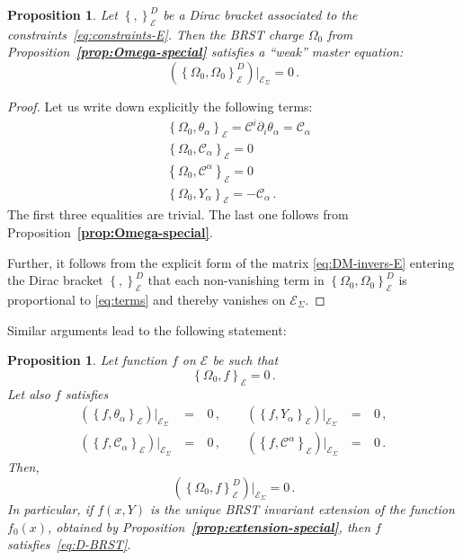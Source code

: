 \documentclass[a4paper,11pt]{amsart}
\newtheorem{prop}[thm]{Proposition}
\numberwithin{thm}{section} %
\numberwithin{equation}{section} %
\numberwithin{figure}{section} %
\newcommand{\bref}[1]{{\bf \ref{#1}}}
\newcommand{\pb}[2]{\left\{{}#1{},{}#2{}\right\}}
\renewcommand{\:}{{\rm\, :\,}}
\def\d{\partial}
\def\cc{{\mathcal C}}
\def\E{{ \mathcal E}}
\begin{document}
\begin{prop}\label{prop:Omega-red}
Let $\pb{}{}^D_\E$ be a Dirac bracket associated to
the constraints~\eqref{eq:constraints-E}. Then the BRST charge $\Omega_0$
from Proposition~\bref{prop:Omega-special} satisfies a ``weak'' master
equation:
\begin{equation}
\left(  \pb{\Omega_0}{\Omega_0}^D_\E \right){\bigr|}_{\E_\Sigma}=0\,.
\end{equation}
\end{prop}
\begin{proof}
Let us write down explicitly the following terms:
\begin{equation}
\label{eq:terms}
  \begin{split}
&    \pb{\Omega_0}{\theta_\alpha}_\E=\cc^i\d_i\theta_\alpha=\cc_\alpha\\
&    \pb{\Omega_0}{\cc_\alpha}_\E=0\\
&    \pb{\Omega_0}{\cc^\alpha}_\E=0\\
&    \pb{\Omega_0}{Y_\alpha}_\E=-\cc_\alpha\,.
\end{split}
\end{equation}
The first three equalities are trivial. The last one follows from
Proposition~\bref{prop:Omega-special}.


Further, it follows from the explicit form of the matrix
\eqref{eq:DM-invers-E} entering the Dirac bracket
$\pb{}{}^D_\E$ that each non-vanishing term in $\pb{\Omega_0}{\Omega_0}^D_\E$ is
proportional to \eqref{eq:terms} and thereby vanishes on $\E_\Sigma$.
\end{proof}
Similar arguments lead to the following statement:
\begin{prop}\label{prop:observables-red}
Let function $f$ on $\E$ be such that
\begin{equation}
  \pb{\Omega_0}{f}_\E=0\,.
\end{equation}
Let also $f$ satisfies
\begin{equation}
\begin{aligned}
  (\pb{f}{\theta_\alpha}_\E){\bigr|}_{\E_\Sigma}&~=~&0\,,\qquad
  (\pb{f}{Y_\alpha}_\E){\bigr|}_{\E_\Sigma}&~=~&0\,,\\
  (\pb{f}{\cc_\alpha}_\E){\bigr|}_{\E_\Sigma}&~=~&0\,,\qquad
  (\pb{f}{\cc^\alpha}_\E){\bigr|}_{\E_\Sigma}&~=~&0\,.
\end{aligned}
\end{equation}
Then,
\begin{equation}
\label{eq:D-BRST}
  (\pb{\Omega_0}{f}^D_\E){\bigr|}_{\E_\Sigma}=0\,.
\end{equation}
In particular, if $f(x,Y)$ is the unique BRST invariant extension
of the function $f_0(x)$, obtained by
Proposition~\bref{prop:extension-special},
then $f$ satisfies~\eqref{eq:D-BRST}.
\end{prop}
\end{document}
